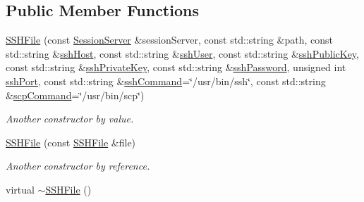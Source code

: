 \subsection*{Public Member Functions}
\begin{DoxyCompactItemize}
\item 
\hyperlink{classSSHFile_a290ef8ca31782187379af1d38cbf0598}{SSHFile} (const \hyperlink{classSessionServer}{SessionServer} \&sessionServer, const std::string \&path, const std::string \&\hyperlink{classSSHFile_a5a4a3d20457a33f57824b7defe7c2df5}{sshHost}, const std::string \&\hyperlink{classSSHFile_a4c6b4d096a6a9fd2043bcd24990f1ba1}{sshUser}, const std::string \&\hyperlink{classSSHFile_af11b98c5b07958117814b032f1ebbcd1}{sshPublicKey}, const std::string \&\hyperlink{classSSHFile_a31b70dd7571b49a4be99c40e1150a8fc}{sshPrivateKey}, const std::string \&\hyperlink{classSSHFile_a824e84e8d2ddfe669b6d824f06527c44}{sshPassword}, unsigned int \hyperlink{classSSHFile_affe979a9a81151e5094608ca9553745d}{sshPort}, const std::string \&\hyperlink{classSSHFile_a4c78048685325e41ae6ca61ab7c5cdc4}{sshCommand}=\char`\"{}/usr/bin/ssh\char`\"{}, const std::string \&\hyperlink{classSSHFile_a7ae092c6888e1e256346e393f7ac075e}{scpCommand}=\char`\"{}/usr/bin/scp\char`\"{})
\begin{DoxyCompactList}\small\item\em Another constructor by value. \item\end{DoxyCompactList}\item 
\hyperlink{classSSHFile_a549e78912b9f41dcd939078fe6f15a8f}{SSHFile} (const \hyperlink{classSSHFile}{SSHFile} \&file)
\begin{DoxyCompactList}\small\item\em Another constructor by reference. \item\end{DoxyCompactList}\item 
\hypertarget{classSSHFile_a9d2d77fd758375e3fc4dd8e31d5c7e1c}{
virtual \hyperlink{classSSHFile_a9d2d77fd758375e3fc4dd8e31d5c7e1c}{$\sim$SSHFile} ()}
\label{classSSHFile_a9d2d77fd758375e3fc4dd8e31d5c7e1c}


\end{DoxyCompactItemize}
